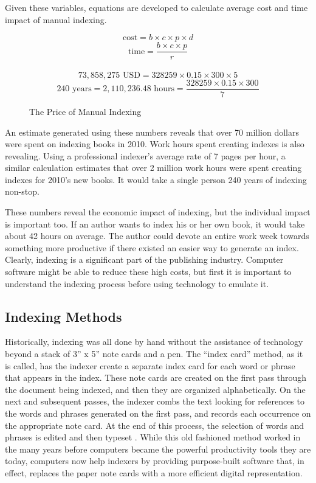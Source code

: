 Given these variables, equations are developed to calculate average cost and time impact of manual indexing.

\begin{figure}[H]
$$ \text{cost} = b \times c \times p \times d $$
$$ \text{time} = \frac{b \times c \times p}{r} $$
\\
$$ 73,858,275 \text{ USD} = 328259 \times 0.15 \times 300 \times 5 $$
$$ 240 \text{ years}= 2,110,236.48 \text{ hours} = \frac{328259 \times 0.15 \times 300}{7}$$
\caption{The Price of Manual Indexing}
\end{figure}

An estimate generated using these numbers reveals that over 70 million dollars were spent on indexing books in 2010. Work hours spent creating indexes is also revealing.
Using a professional indexer's average rate of 7 pages per hour, a similar calculation estimates that over 2 million work hours were spent creating indexes for 2010's new books. It would take a single person 240 years of indexing non-stop.

These numbers reveal the economic impact of indexing, but the individual impact is important too.
If an author wants to index his or her own book, it would take about 42 hours on average. The author could devote an entire work week towards something more productive if there existed an easier way to generate an index.
Clearly, indexing is a significant part of the publishing industry.
Computer software might be able to reduce these high costs, but first it is important to understand the indexing process before using technology to emulate it.

\subsection{Indexing Methods}
\label{sec:indexing-methods}

Historically, indexing was all done by hand without the assistance of technology beyond a stack of 3'' x 5'' note cards and a pen.
The ``index card'' method, as it is called, has the indexer create a separate index card for each word or phrase that appears in the index.
These note cards are created on the first pass through the document being indexed, and then they are organized alphabetically.
On the next and subsequent passes, the indexer combs the text looking for references to the words and phrases generated on the first pass, and records each occurrence on the appropriate note card.
At the end of this process, the selection of words and phrases is edited and then typeset \cite{mulvany}.
While this old fashioned method worked in the many years before computers became the powerful productivity tools they are today, computers now help indexers by providing purpose-built software that, in effect, replaces the paper note cards with a more efficient digital representation.

